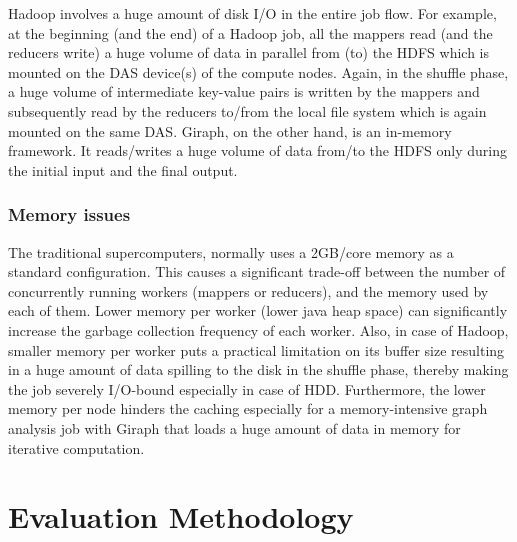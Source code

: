 \documentclass[conference]{IEEEtran}
\begin{document}
Hadoop involves a huge amount of disk I/O in the entire job flow. For example, at the beginning (and the end) of a Hadoop job, all the mappers read (and the reducers write) a huge volume of data in parallel from (to) the HDFS which is mounted on the DAS device(s) of the compute nodes. Again, in the shuffle phase, a huge volume of intermediate key-value pairs is written by the mappers and subsequently read by the reducers to/from the local file system which is again mounted on the same DAS. Giraph, on the other hand, is an in-memory framework. It reads/writes a huge volume of data from/to the HDFS only during the initial input and the final output.
\subsubsection {Memory issues}
The traditional supercomputers, normally uses a 2GB/core memory as a standard configuration. This causes a significant trade-off between the number of concurrently running workers (mappers or reducers), and the memory used by each of them. Lower memory per worker (lower java heap space) can significantly increase the garbage collection frequency of each worker. Also, in case of Hadoop, smaller memory per worker puts a practical limitation on its buffer size resulting in a huge amount of data spilling to the disk in the shuffle phase, thereby making the job severely I/O-bound especially in case of HDD. Furthermore, the lower memory per node hinders the caching especially for a memory-intensive graph analysis job with Giraph that loads a huge amount of data in memory for iterative computation.

\section {Evaluation Methodology} \label{EvaluationMethodology}
\end{document}
